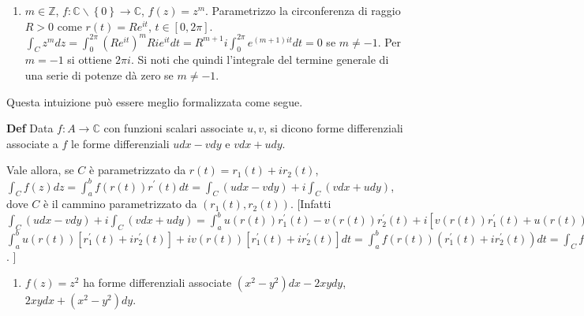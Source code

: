 \documentclass{article}
\begin{document}
\begin{enumerate}
\item $m\in 
\mathbb{Z}
$, $f:%
\mathbb{C}
\backslash \left\{ 0\right\} \rightarrow 
\mathbb{C}
$, $f\left( z\right) =z^{m}$. Parametrizzo la circonferenza di raggio $R>0$
come $r\left( t\right) =Re^{it}$, $t\in \left[ 0,2\pi \right] $. $%
\int_{C}z^{m}dz=\int_{0}^{2\pi }\left( Re^{it}\right)
^{m}Rie^{it}dt=R^{m+1}i\int_{0}^{2\pi }e^{\left( m+1\right) it}dt=0$ se $%
m\neq -1$. Per $m=-1$ si ottiene $2\pi i$. Si noti che quindi l'integrale
del termine generale di una serie di potenze d\`{a} zero se $m\neq -1$.
\end{enumerate}

Questa intuizione pu\`{o} essere meglio formalizzata come segue.

\textbf{Def} Data $f:A\rightarrow 
\mathbb{C}
$ con funzioni scalari associate $u,v$, si dicono forme differenziali
associate a $f$ le forme differenziali $udx-vdy$ e $vdx+udy$.

Vale allora, se $C$ \`{e} parametrizzato da $r\left( t\right) =r_{1}\left(
t\right) +ir_{2}\left( t\right) $, $\int_{C}f\left( z\right)
dz=\int_{a}^{b}f\left( r\left( t\right) \right) r^{\prime }\left( t\right)
dt=\int_{C}\left( udx-vdy\right) +i\int_{C}\left( vdx+udy\right) $, dove $C$ 
\`{e} il cammino parametrizzato da $\left( r_{1}\left( t\right) ,r_{2}\left(
t\right) \right) $. [Infatti $\int_{C}\left( udx-vdy\right) +i\int_{C}\left(
vdx+udy\right) =\int_{a}^{b}u\left( r\left( t\right) \right) r_{1}^{\prime
}\left( t\right) -v\left( r\left( t\right) \right) r_{2}^{\prime }\left(
t\right) +i\left[ v\left( r\left( t\right) \right) r_{1}^{\prime }\left(
t\right) +u\left( r\left( t\right) \right) r_{2}^{\prime }\left( t\right) %
\right] dt=$ $\int_{a}^{b}u\left( r\left( t\right) \right) \left[
r_{1}^{\prime }\left( t\right) +ir_{2}^{\prime }\left( t\right) \right]
+iv\left( r\left( t\right) \right) \left[ r_{1}^{\prime }\left( t\right)
+ir_{2}^{\prime }\left( t\right) \right] dt=\int_{a}^{b}f\left( r\left(
t\right) \right) \left( r_{1}^{\prime }\left( t\right) +ir_{2}^{\prime
}\left( t\right) \right) dt=\int_{C}f\left( z\right) dz$. ]

\begin{enumerate}
\item $f\left( z\right) =z^{2}$ ha forme differenziali associate $\left(
x^{2}-y^{2}\right) dx-2xydy$, $2xydx+\left( x^{2}-y^{2}\right) dy$.
\end{enumerate}
\end{document}
